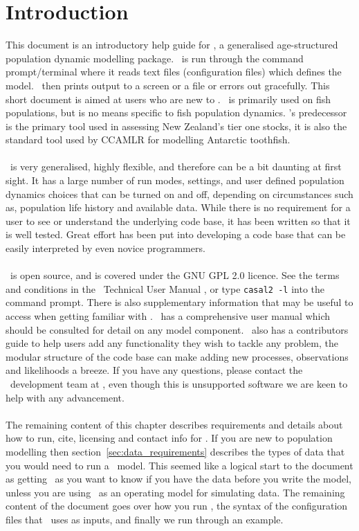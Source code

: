 \section{Introduction}\label{sec:introduction}

This document is an introductory help guide for \CNAME, a generalised age-structured population dynamic modelling package. \CNAME\ is run through the command prompt/terminal where it reads text files (configuration files) which defines the model. \CNAME\ then prints output to a screen or a file or errors out gracefully. This short document is aimed at users who are new to \CNAME. \CNAME\ is primarily used on fish populations, but is no means specific to fish population dynamics. \CNAME's predecessor is the primary tool used in assessing New Zealand's tier one stocks, it is also the standard tool used by CCAMLR for modelling Antarctic toothfish. 
\\\\
\CNAME\ is very generalised, highly flexible, and therefore can be a bit daunting at first sight. It has a large number of run modes, settings, and user defined population dynamics choices that can be turned on and off, depending on circumstances such as, population life history and available data. While there is no requirement for a user to see or understand the underlying code base, it has been written so that it is well tested. Great effort has been put into developing a code base that can be easily interpreted by even novice programmers.
\\\\
\CNAME\ is open source, and is covered under the GNU GPL 2.0 licence. See the terms and conditions in the \CNAME\ Technical User Manual \citep{CASAL2}, or type \texttt{casal2 -l} into the command prompt. There is also supplementary information that may be useful to access when getting familiar with \CNAME. \CNAME\ has a comprehensive user manual \citep{CASAL2} which should be consulted for detail on any model component. \CNAME\ also has a contributors guide to help users add any functionality they wish to tackle any problem, the modular structure of the code base can make adding new processes, observations and likelihoods a breeze. If you have any questions, please contact the \CNAME\ development team at \email, even though this is unsupported software we are keen to help with any advancement.
\\\\
The remaining content of this chapter describes requirements and details about how to run, cite, licensing and contact info for \CNAME. If you are new to population modelling then section~\ref{sec:data_requirements} describes the types of data that you would need to run a \CNAME\ model. This seemed like a logical start to the document as getting \CNAME\ as you want to know if you have the data before you write the model, unless you are using \CNAME\ as an operating model for simulating data. 
The remaining content of the document goes over how you run \CNAME, the syntax of the configuration files that \CNAME\ uses as inputs, and finally we run through an example.
\\\\
